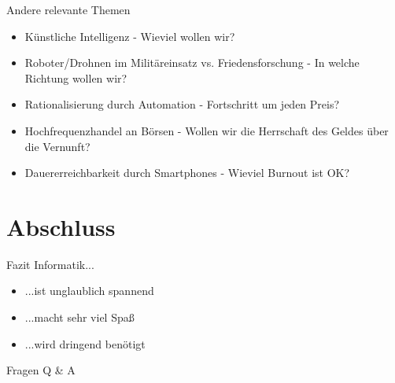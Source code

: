 \documentclass{beamer}
\begin{document}
\begin{frame}{Andere relevante Themen}
  \begin{itemize}
    \item Künstliche Intelligenz - Wieviel wollen wir?
    \item Roboter/Drohnen im Militäreinsatz vs. Friedensforschung - In welche Richtung wollen wir?
    \item Rationalisierung durch Automation - Fortschritt um jeden Preis?
    \item Hochfrequenzhandel an Börsen - Wollen wir die Herrschaft des Geldes über die Vernunft?
    \item Dauererreichbarkeit durch Smartphones - Wieviel Burnout ist OK?
  \end{itemize}
\end{frame}
\section{Abschluss}
\begin{frame}{Fazit}
  Informatik...
  \begin{itemize}
    \item ...ist unglaublich spannend
    \item ...macht sehr viel Spaß
    \item ...wird dringend benötigt
  \end{itemize}
\end{frame}
\begin{frame}{Fragen}
  \centering
  Q \& A
\end{frame}
\end{document}
